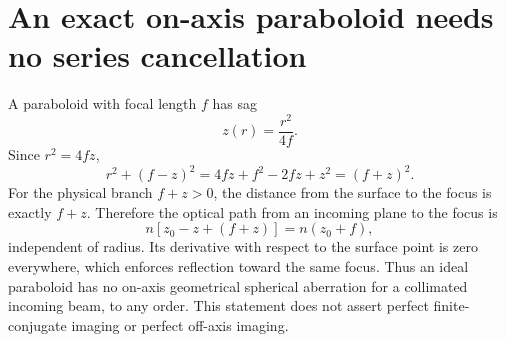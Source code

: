 \section{An exact on-axis paraboloid needs no series cancellation}
A paraboloid with focal length $f$ has sag
\begin{equation}z(r)=\frac{r^2}{4f}.\end{equation}
Since $r^2=4fz$,
\begin{equation}
 r^2+(f-z)^2=4fz+f^2-2fz+z^2=(f+z)^2.
\end{equation}
For the physical branch $f+z>0$, the distance from the surface to the focus
is exactly $f+z$. Therefore the optical path from an incoming plane to the
focus is
\begin{equation}
 n[z_0-z+(f+z)]=n(z_0+f),
\end{equation}
independent of radius. Its derivative with respect to the surface point is
zero everywhere, which enforces reflection toward the same focus. Thus an
ideal paraboloid has no on-axis geometrical spherical aberration for a
collimated incoming beam, to any order. This statement does not assert perfect
finite-conjugate imaging or perfect off-axis imaging.

